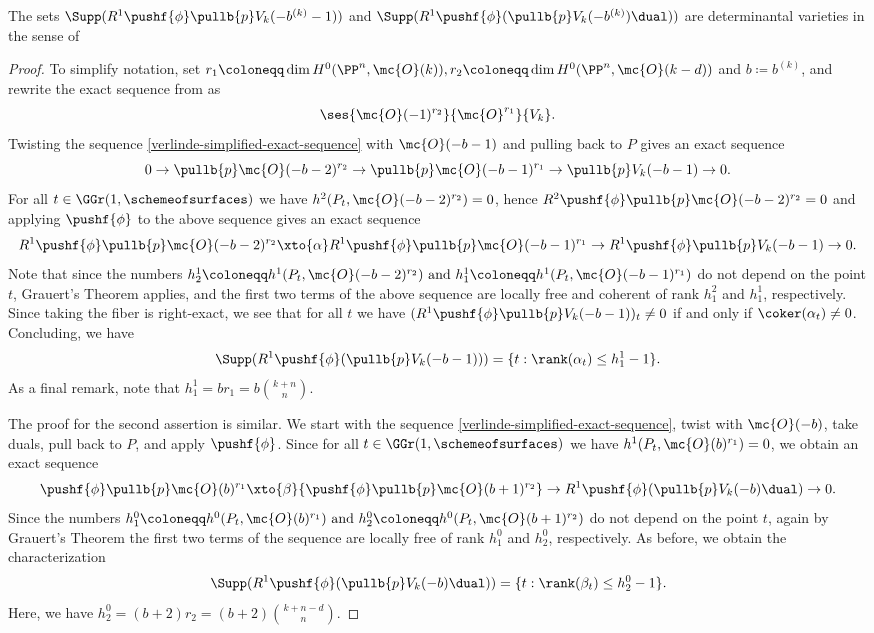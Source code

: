\begin{proposition} \label{supp-are-det-varieties}
The sets
$\Supp(R^1 \pushf{\phi}\pullb{p} V_{k}(-b^{(k)}-1))$ and
$\Supp(R^1 \pushf{\phi}(\pullb{p} V_{k}(-b^{(k)})\dual))$ 
are determinantal varieties in the sense of \cite[Ch.~II, §4]{arbarello-geometry-algebraic-curves}
\end{proposition}
\begin{proof}
To simplify notation, set
$r_1 \coloneqq \dim H^0(\PP^n, \mc{O}(k)),
r_2 \coloneqq \dim H^0(\PP^n, \mc{O}(k-d))$ and $b\coloneqq b^{(k)}$,
and rewrite the exact sequence from  as
\begin{align} \label{verlinde-simplified-exact-sequence}
\ses{\mc{O}(-1)^{r_2}}{\mc{O}^{r_1}}{V_k}. %
\end{align}
Twisting the sequence \cref{verlinde-simplified-exact-sequence} with $\mc{O}(-b-1)$ and pulling back to $P$ gives an exact sequence
\[
0
\to  {\pullb{p}\mc{O}(-b-2)^{r_2}}
\to  {\pullb{p}\mc{O}(-b-1)^{r_1}}
\to  {\pullb{p}V_k(-b-1)}
\to  0.
\]
For all $t\in \GGr(1,\schemeofsurfaces)$ we have
$h^2(P_t, \mc{O}(-b-2)^{r_2}) = 0$,
hence
$R^2\pushf{\phi}\pullb{p}\mc{O}(-b-2)^{r_2} = 0$
and applying $\pushf{\phi}$ to the above sequence gives an exact sequence
\[
R^1\pushf{\phi}\pullb{p}\mc{O}(-b-2)^{r_2}
\xto{\alpha}
R^1\pushf{\phi}\pullb{p}\mc{O}(-b-1)^{r_1} 
\to
R^1\pushf{\phi}\pullb{p} V_k(-b-1)
\to 0.
\]
Note that since the numbers
$
h^{1}_{2}\coloneqq h^1(P_t, \mc{O}(-b-2)^{r_2})
\text{ and }
h_{1}^{1}\coloneqq h^1(P_t, \mc{O}(-b-1)^{r_1})
$
do not depend on the point $t$, Grauert's Theorem applies, and the first two terms of the above sequence are locally free and coherent of rank $h_1^2$ and $h_1^1$, respectively. Since taking the fiber is right-exact, we see that for all $t$ we have
$(R^1\pushf{\phi}\pullb{p} V_k(-b-1))_t \neq 0$ if and only if $\coker(\alpha_t) \neq 0$. Concluding, we have
\[
\Supp(R^1\pushf{\phi}(\pullb{p} V_k(-b-1)))
= \{t : \rank (\alpha_t)\leq h^{1}_1 - 1\}.
\]
As a final remark, note that $h^1_1 = b r_1 = b \binom{k+n}{n}.$

The proof for the second assertion is similar. We start with the sequence \cref{verlinde-simplified-exact-sequence}, twist with $\mc{O}(-b)$, take duals, pull back to $P$, and apply $\pushf{\phi}$. Since for all $t\in \GGr(1,\schemeofsurfaces)$ we have $h^1(P_t, \mc{O}(b)^{r_1})=0$, we obtain an exact sequence
\[
	{\pushf{\phi}\pullb{p}\mc{O}(b)^{r_1} }
\xto{\beta}	{\pushf{\phi}\pullb{p}\mc{O}(b+1)^{r_2}}
\to	{R^1 \pushf{\phi}(\pullb{p} V_{k}(-b)\dual)}
\to 0.
\]
Since the numbers
$
h^0_1 \coloneqq h^0(P_t,\mc{O}(b)^{r_1}) \text{ and }
h^0_2 \coloneqq h^0(P_t, \mc{O}(b+1)^{r_2})
$
do not depend on the point $t$, again by Grauert's Theorem the first two terms of the sequence are locally free of rank $h^0_1$ and $h^0_2$, respectively. As before, we obtain the characterization
\[
	\Supp(R^1 \pushf{\phi}(\pullb{p} V_{k}(-b)\dual))
	= \{t : \rank (\beta_t)\leq h^{0}_2 - 1\}.
\]
Here, we have $h_2^0 = (b+2)r_2 = (b+2)\binom{k+n-d}{n}.$
\end{proof}
